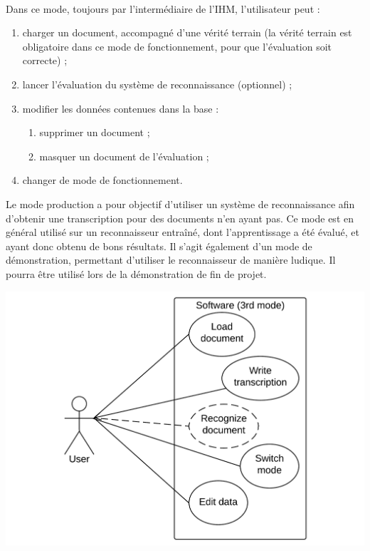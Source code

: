 \paragraph{}

Dans ce mode, toujours par l’intermédiaire de l’IHM, l’utilisateur peut :
\begin{enumerate}
\item charger un document, accompagné d’une vérité terrain (la vérité terrain
est obligatoire dans ce mode de fonctionnement, pour que l’évaluation soit
correcte) ;
\item lancer l’évaluation du système de reconnaissance (optionnel) ;
\item modifier les données contenues dans la base :
\begin{enumerate}
\item supprimer un document ;
\item masquer un document de l’évaluation ;
\end{enumerate}
\item changer de mode de fonctionnement.
\end{enumerate}

\newpage

Le mode production a pour objectif d’utiliser un système de reconnaissance afin
d’obtenir une transcription pour des documents n’en ayant pas. Ce mode est en
général utilisé sur un reconnaisseur entraîné, dont l’apprentissage a été
évalué, et ayant donc obtenu de bons résultats. Il s’agit également d’un mode
de démonstration, permettant d’utiliser le reconnaisseur de manière ludique.
Il pourra être utilisé lors de la démonstration de fin de projet.

\begin{mdframed}[frametitle={Figure 4 : Diagramme de cas d'utilisation (mode production)}, innerbottommargin=10]
\begin{center}
\includegraphics[scale=0.4]{Usecase_3.pdf}
\end{center}
\end{mdframed}


